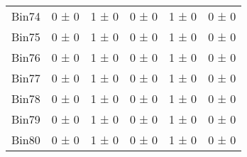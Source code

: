 \begin{tabular}{@{\extracolsep{4pt}}lccccc@{}}
     Bin74 & 0 ± 0 & 1 ± 0 & 0 ± 0 & 1 ± 0 & 0 ± 0 \\ 
     Bin75 & 0 ± 0 & 1 ± 0 & 0 ± 0 & 1 ± 0 & 0 ± 0 \\ 
     Bin76 & 0 ± 0 & 1 ± 0 & 0 ± 0 & 1 ± 0 & 0 ± 0 \\ 
     Bin77 & 0 ± 0 & 1 ± 0 & 0 ± 0 & 1 ± 0 & 0 ± 0 \\ 
     Bin78 & 0 ± 0 & 1 ± 0 & 0 ± 0 & 1 ± 0 & 0 ± 0 \\ 
     Bin79 & 0 ± 0 & 1 ± 0 & 0 ± 0 & 1 ± 0 & 0 ± 0 \\ 
     Bin80 & 0 ± 0 & 1 ± 0 & 0 ± 0 & 1 ± 0 & 0 ± 0 \\ 
\hline\hline
  \end{tabular}
